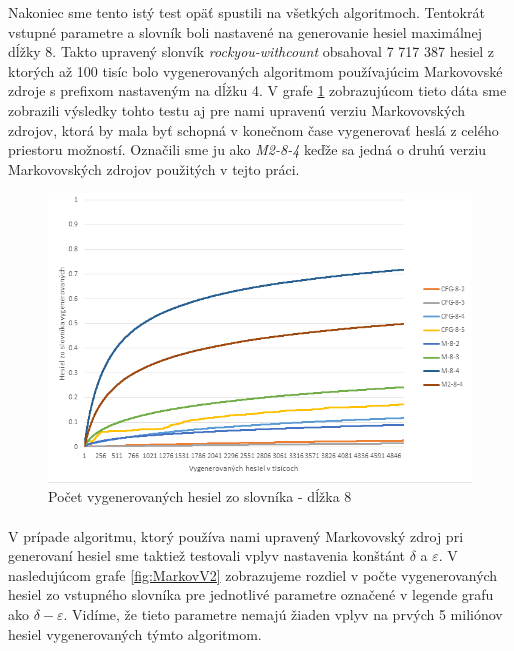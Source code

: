 Nakoniec sme tento istý test opäť spustili na všetkých algoritmoch. Tentokrát vstupné parametre a slovník boli nastavené na generovanie hesiel maximálnej dĺžky 8. Takto upravený slonvík \emph{rockyou-withcount} obsahoval 7 717 387 hesiel z ktorých až 100 tisíc bolo vygenerovaných algoritmom používajúcim Markovovské zdroje s prefixom nastaveným na dĺžku 4. V grafe \ref{fig:Acc8} zobrazujúcom tieto dáta sme zobrazili výsledky tohto testu aj pre nami upravenú verziu Markovovských zdrojov, ktorá by mala byť schopná v konečnom čase vygenerovať heslá z celého priestoru možností. Označili sme ju ako \emph{M2-8-4} keďže sa jedná o druhú verziu Markovovských zdrojov použitých v tejto práci.

\begin{figure}[ht]
    \centering
    \includegraphics[width=1\textwidth]{sameDictAcc8}
    \caption{Počet vygenerovaných hesiel zo slovníka - dĺžka 8}
    \label{fig:Acc8}
\end{figure}

\paragraph{}
V prípade algoritmu, ktorý používa nami upravený Markovovský zdroj pri generovaní hesiel sme taktiež testovali vplyv nastavenia konštánt \(\delta\) a \(\varepsilon\). V nasledujúcom grafe \ref{fig:MarkovV2} zobrazujeme rozdiel v počte vygenerovaných hesiel zo vstupného slovníka pre jednotlivé parametre označené v legende grafu ako \(\delta-\varepsilon\). Vidíme, že tieto parametre nemajú žiaden vplyv na prvých 5 miliónov hesiel vygenerovaných týmto algoritmom.

